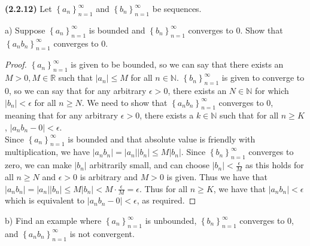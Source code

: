 \documentclass[12pt]{article}
\newcommand{\abs}[1]{\left| {#1} \right|}
\newcommand{\seq}[2][n]{\left\{ {#2} \right\}_{#1=1}^\infty}
\newcommand{\bR}{\mathbb{R}}
\newcommand{\bN}{\mathbb{N}}
\begin{document}
\newpage

\noindent \textbf{(2.2.12)} Let $\seq{a_n}$ and $\seq{b_n}$ be sequences.

\noindent a) Suppose $\seq{a_n}$ is bounded and $\seq{b_n}$ converges to 0. Show that $\seq{a_nb_n}$ converges to 0.

\begin{proof}
	$\seq{a_n}$ is given to be bounded, so we can say that there exists an $M>0,M\in\bR$ such that $\abs{a_n}\le M$ for all $n\in\bN$. $\seq{b_n}$ is given to converge to 0, so we can say that for any arbitrary $\epsilon>0$, there exists an $N\in\bN$ for which $\abs{b_n}<\epsilon$ for all $n\ge N$. We need to show that $\seq{a_nb_n}$ converges to 0, meaning that for any arbitrary $\epsilon>0$, there exists a $k\in\bN$ such that for all $n\ge K$, $\abs{a_nb_n-0}<\epsilon$. \\
	
\indent Since $\seq{a_n}$ is bounded and that absolute value is friendly with multiplication, we have $\abs{a_nb_n}=\abs{a_n}\abs{b_n}\le M\abs{b_n}$. Since $\seq{b_n}$ converges to zero, we can make $\abs{b_n}$ arbitrarily small, and can choose $\abs{b_n}<\frac{\epsilon}{M}$ as this holds for all $n\ge N$ and $\epsilon>0$ is arbitrary and $M>0$ is given. Thus we have that $\abs{a_nb_n}=\abs{a_n}\abs{b_n}\le M\abs{b_n}<M\cdot\frac{\epsilon}{M}=\epsilon$. Thus for all $n\ge K$, we have that $\abs{a_nb_n}<\epsilon$ which is equivalent to $\abs{a_nb_n-0}<\epsilon$, as required. 
\end{proof}

\noindent b) Find an example where $\seq{a_n}$ is unbounded, $\seq{b_n}$ converges to 0, and $\seq{a_nb_n}$ is not convergent.
\end{document}
